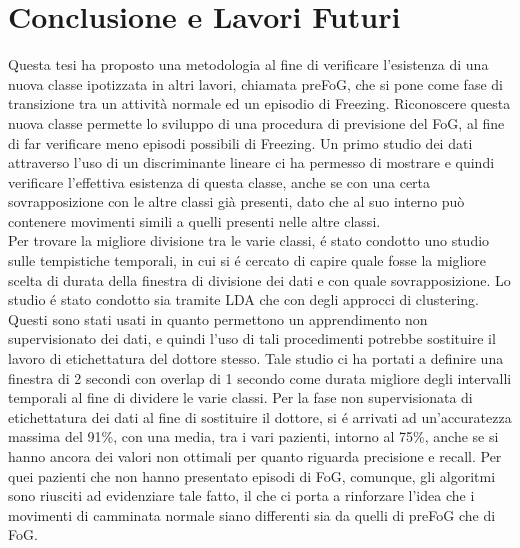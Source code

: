 
\chapter{Conclusione e Lavori Futuri}\label{chap9:Concl}
Questa tesi ha proposto una metodologia al fine di verificare l'esistenza di una nuova classe ipotizzata in altri lavori, chiamata preFoG, che si pone come fase di transizione tra un attività normale ed un episodio di Freezing. Riconoscere questa nuova classe permette lo sviluppo di una procedura di previsione del FoG, al fine di far verificare meno episodi possibili di Freezing. Un primo studio dei dati attraverso l'uso di un discriminante lineare ci ha permesso di mostrare e quindi verificare l'effettiva esistenza di questa classe, anche se con una certa sovrapposizione con le altre classi già presenti, dato che al suo interno può contenere movimenti simili a quelli presenti nelle altre classi.\\ 
Per trovare la migliore divisione tra le varie classi, é stato condotto uno studio sulle tempistiche temporali, in cui si é cercato di capire quale fosse la migliore scelta di durata della finestra di divisione dei dati e con quale sovrapposizione. Lo studio é stato condotto sia tramite LDA che con degli approcci di clustering. Questi sono stati usati in quanto permettono un apprendimento non supervisionato dei dati, e quindi l'uso di tali procedimenti potrebbe sostituire il lavoro di etichettatura del dottore stesso. Tale studio ci ha portati a definire una finestra di 2 secondi con overlap di 1 secondo come durata migliore degli intervalli temporali al fine di dividere le varie classi. Per la fase non supervisionata di etichettatura dei dati al fine di sostituire il dottore, si é arrivati ad un'accuratezza massima del 91\%, con una media, tra i vari pazienti, intorno al 75\%, anche se si hanno ancora dei valori non ottimali per quanto riguarda precisione e recall. Per quei pazienti che non hanno presentato episodi di FoG, comunque, gli algoritmi sono riusciti ad evidenziare tale fatto, il che ci porta a rinforzare l'idea che i movimenti di camminata normale siano differenti sia da quelli di preFoG che di FoG.\\
